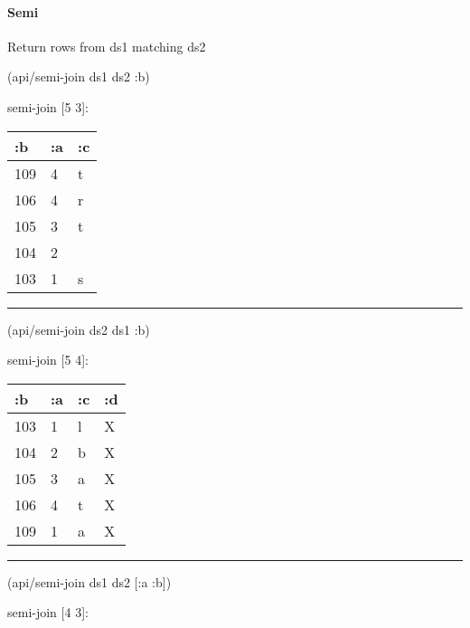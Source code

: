 \documentclass[]{article}
\newenvironment{Shaded}{\begin{snugshade}}{\end{snugshade}}
\newcommand{\AttributeTok}[1]{\textcolor[rgb]{0.77,0.63,0.00}{#1}}
\newcommand{\NormalTok}[1]{#1}
\let\oldparagraph\paragraph
\renewcommand{\paragraph}[1]{\oldparagraph{#1}\mbox{}}
\begin{document}
\paragraph{Semi}\label{semi}

Return rows from ds1 matching ds2

\begin{Shaded}
\begin{Highlighting}[]
\NormalTok{(api/semi-join ds1 ds2 }\AttributeTok{:b}\NormalTok{)}
\end{Highlighting}
\end{Shaded}

semi-join {[}5 3{]}:

\begin{longtable}[]{@{}lll@{}}
\toprule
:b & :a & :c\tabularnewline
\midrule
\endhead
109 & 4 & t\tabularnewline
106 & 4 & r\tabularnewline
105 & 3 & t\tabularnewline
104 & 2 &\tabularnewline
103 & 1 & s\tabularnewline
\bottomrule
\end{longtable}

\begin{center}\rule{0.5\linewidth}{0.5pt}\end{center}

\begin{Shaded}
\begin{Highlighting}[]
\NormalTok{(api/semi-join ds2 ds1 }\AttributeTok{:b}\NormalTok{)}
\end{Highlighting}
\end{Shaded}

semi-join {[}5 4{]}:

\begin{longtable}[]{@{}llll@{}}
\toprule
:b & :a & :c & :d\tabularnewline
\midrule
\endhead
103 & 1 & l & X\tabularnewline
104 & 2 & b & X\tabularnewline
105 & 3 & a & X\tabularnewline
106 & 4 & t & X\tabularnewline
109 & 1 & a & X\tabularnewline
\bottomrule
\end{longtable}

\begin{center}\rule{0.5\linewidth}{0.5pt}\end{center}

\begin{Shaded}
\begin{Highlighting}[]
\NormalTok{(api/semi-join ds1 ds2 [}\AttributeTok{:a} \AttributeTok{:b}\NormalTok{])}
\end{Highlighting}
\end{Shaded}

semi-join {[}4 3{]}:
\end{document}
